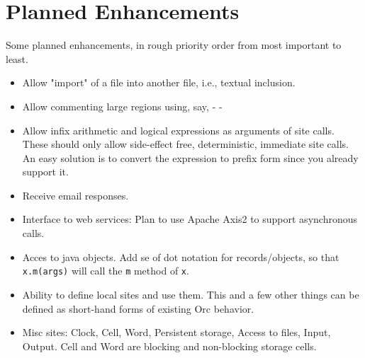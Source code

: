 \documentclass{article}
\begin{document}

\section{Planned Enhancements}

Some planned enhancements, in rough priority order from most important to least.

\begin{itemize}

\item Allow "import" of a file into another file, i.e., textual inclusion.

\item Allow commenting large regions using, say, {- -}

\item Allow infix arithmetic and logical expressions as arguments of site
  calls. These should only allow side-effect free,
  deterministic, immediate site calls. An easy solution is to convert
  the expression to prefix form since you already support it.

\item Receive email responses.

\item Interface to web services:
	Plan to use Apache Axis2 to support asynchronous calls.

\item Acces to java objects. Add se of dot notation for records/objects, so that 
  {\tt x.m(args)} will call the {\tt m} method of {\tt x}.
  
\item Ability to define local sites and use them. This and a few other things
	can be defined as short-hand forms of existing Orc behavior.

\item Misc sites:
	Clock, 
	Cell, 
	Word,
	Persistent storage, 
	Access to files,
	Input, Output.
	Cell and Word are blocking and non-blocking storage cells.
	

\end{itemize}


\end{document}
